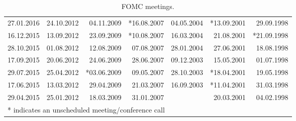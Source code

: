 \documentclass[11pt,a4paper,english,oneside]{book}
\numberwithin{equation}{chapter}
\begin{document}
\begin{table}[h]
\begin{tabular}{r r r r r r r }
						27.01.2016 & 24.10.2012 & 04.11.2009 & *16.08.2007 & 04.05.2004 & *13.09.2001 & 29.09.1998 \\
						16.12.2015 & 13.09.2012 & 23.09.2009 & *10.08.2007 & 16.03.2004 & 21.08.2001 & *21.09.1998 \\
						28.10.2015 & 01.08.2012 & 12.08.2009 & 07.08.2007 & 28.01.2004 & 27.06.2001 & 18.08.1998 \\
						17.09.2015 & 20.06.2012 & 24.06.2009 & 28.06.2007 & 09.12.2003 & 15.05.2001 & 01.07.1998 \\
						29.07.2015 & 25.04.2012 & *03.06.2009 & 09.05.2007 & 28.10.2003 & *18.04.2001 & 19.05.1998 \\
						17.06.2015 & 13.03.2012 & 29.04.2009 & 21.03.2007 & 16.09.2003 & *11.04.2001 & 31.03.1998 \\
						29.04.2015 & 25.01.2012 & 18.03.2009 & 31.01.2007 &  & 20.03.2001 & 04.02.1998 \\
						\midrule																
						\multicolumn{6}{l}{* indicates an unscheduled meeting/conference call} & \\
		\bottomrule %
	\end{tabular}
	\caption{FOMC meetings.} %
	\label{tab:meetings} %
\end{table}




\newpage
\thispagestyle{empty}
\end{document}
